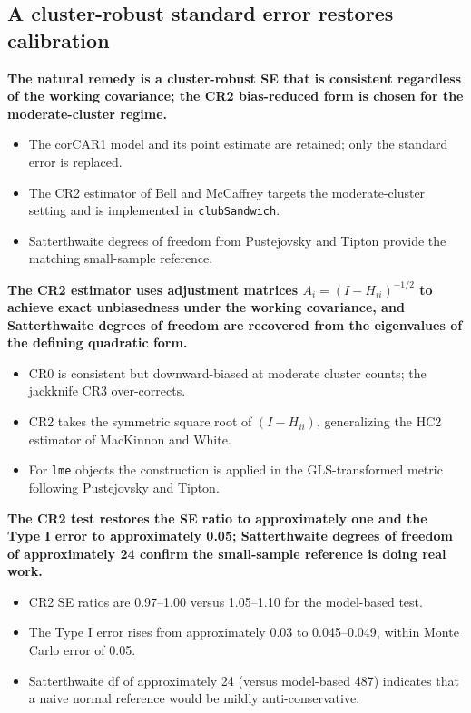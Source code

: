\documentclass[
  11pt,
]{article}
\begin{document}
\subsection{A cluster-robust standard error restores calibration}\label{a-cluster-robust-standard-error-restores-calibration}

\textbf{The natural remedy is a cluster-robust SE that is consistent regardless of the working covariance; the CR2 bias-reduced form is chosen for the moderate-cluster regime.}

\begin{itemize}\setlength{\itemsep}{2pt}\setlength{\parskip}{0pt}
\item The corCAR1 model and its point estimate are retained; only the standard error is replaced.
\item The CR2 estimator of Bell and McCaffrey targets the moderate-cluster setting and is implemented in \texttt{clubSandwich}.
\item Satterthwaite degrees of freedom from Pustejovsky and Tipton provide the matching small-sample reference.
\end{itemize}

\textbf{The CR2 estimator uses adjustment matrices $A_i = (I - H_{ii})^{-1/2}$ to achieve exact unbiasedness under the working covariance, and Satterthwaite degrees of freedom are recovered from the eigenvalues of the defining quadratic form.}

\begin{itemize}\setlength{\itemsep}{2pt}\setlength{\parskip}{0pt}
\item CR0 is consistent but downward-biased at moderate cluster counts; the jackknife CR3 over-corrects.
\item CR2 takes the symmetric square root of $(I - H_{ii})$, generalizing the HC2 estimator of MacKinnon and White.
\item For \texttt{lme} objects the construction is applied in the GLS-transformed metric following Pustejovsky and Tipton.
\end{itemize}

\textbf{The CR2 test restores the SE ratio to approximately one and the Type I error to approximately 0.05; Satterthwaite degrees of freedom of approximately 24 confirm the small-sample reference is doing real work.}

\begin{itemize}\setlength{\itemsep}{2pt}\setlength{\parskip}{0pt}
\item CR2 SE ratios are 0.97--1.00 versus 1.05--1.10 for the model-based test.
\item The Type I error rises from approximately 0.03 to 0.045--0.049, within Monte Carlo error of 0.05.
\item Satterthwaite df of approximately 24 (versus model-based 487) indicates that a naive normal reference would be mildly anti-conservative.
\end{itemize}
\end{document}
